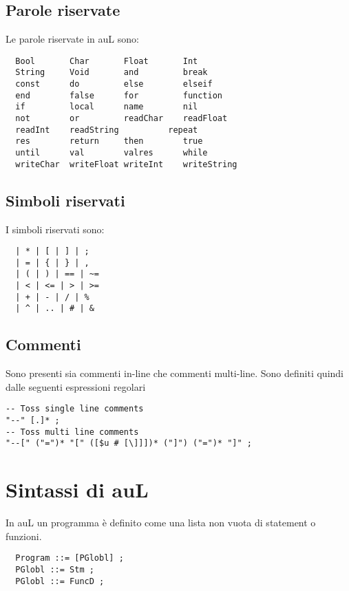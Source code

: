 \documentclass{article}
\begin{document}
\subsection*{Parole riservate}
Le parole riservate in auL sono:
\begin{verbatim}
  Bool       Char       Float       Int
  String     Void       and         break
  const      do         else        elseif
  end        false      for         function
  if         local      name        nil
  not        or         readChar    readFloat
  readInt    readString          repeat
  res        return     then        true
  until      val        valres      while
  writeChar  writeFloat writeInt    writeString
\end{verbatim}

\subsection*{Simboli riservati}
I simboli riservati sono:
\begin{verbatim}
  | * | [ | ] | ;
  | = | { | } | ,
  | ( | ) | == | ~=
  | < | <= | > | >=
  | + | - | / | %
  | ^ | .. | # | &
\end{verbatim}
\subsection*{Commenti}
Sono presenti sia commenti in-line che commenti multi-line. Sono definiti quindi dalle seguenti espressioni regolari
\begin{verbatim}
-- Toss single line comments
"--" [.]* ;
-- Toss multi line comments
"--[" ("=")* "[" ([$u # [\]]])* ("]") ("=")* "]" ;
\end{verbatim}

\section{Sintassi di auL}
In auL un programma è definito come una lista non vuota di statement o funzioni.
\begin{verbatim}
  Program ::= [PGlobl] ;
  PGlobl ::= Stm ;
  PGlobl ::= FuncD ;
\end{verbatim}
\end{document}
